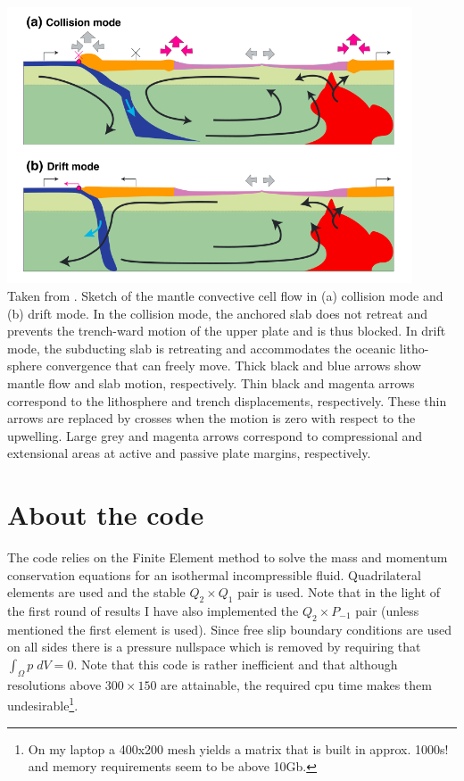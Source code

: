 \begin{center}
\includegraphics[width=12cm]{python_codes/fieldstone_143/images/yahb13_b}\\
{\captionfont 
Taken from \cite{yahb13}. 
Sketch of the mantle convective cell flow in (a) collision mode and (b) drift mode. In the
collision mode, the anchored slab does not retreat and prevents the trench-ward motion of the upper plate
and is thus blocked. In drift mode, the subducting slab is retreating and accommodates the oceanic litho-
sphere convergence that can freely move. Thick black and blue arrows show mantle flow and slab motion,
respectively. Thin black and magenta arrows correspond to the lithosphere and trench displacements,
respectively. These thin arrows are replaced by crosses when the motion is zero with respect to the upwelling.
Large grey and magenta arrows correspond to compressional and extensional areas at active and passive plate
margins, respectively.
}
\end{center}

\section*{About the code}

The code relies on the Finite Element method to solve the mass and momentum conservation
equations for an isothermal incompressible fluid. 
Quadrilateral elements are used and the stable $Q_2\times Q_1$ pair is used.
Note that in the light of the first round of results I have also implemented
the $Q_2\times P_{-1}$ pair (unless mentioned the first element is used). 
Since free slip boundary conditions are used on all sides there is a pressure 
nullspace which is removed by requiring that $\int_\Omega p \; dV=0$.
Note that this code is rather inefficient and that although resolutions above $300 \times 150$ 
are attainable, the required cpu time makes them undesirable\footnote{On my laptop
a 400x200 mesh yields a matrix that is built in approx. 1000s! and memory requirements 
seem to be above 10Gb.}. 

